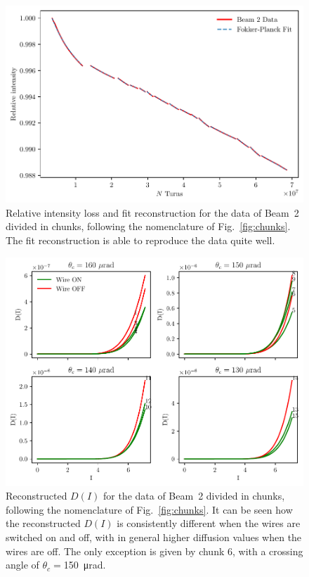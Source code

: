 \begin{figure}[hpt]
    \centering
    \includegraphics[width=1.0\textwidth]{5_wire_compensators_LHC/figs/losses_b2.pdf}
    \caption{Relative intensity loss and fit reconstruction for the data of Beam~2 divided in chunks, following the nomenclature of Fig.~\ref{fig:chunks}. 
    The fit reconstruction is able to reproduce the data quite well.}
    \label{fig:reconstruction_4}
\end{figure}

\begin{figure}[hpt]
    \centering
    \includegraphics[width=1.0\textwidth]{5_wire_compensators_LHC/figs/fokker_planck_b2_2.pdf}
    \caption{Reconstructed $D(I)$ for the data of Beam~2 divided in chunks, following the nomenclature of Fig.~\ref{fig:chunks}. It can be seen how the reconstructed $D(I)$ is consistently different when the wires are switched on and off, with in general higher diffusion values when the wires are off. The only exception is given by chunk 6, with a crossing angle of $\theta_c=$\SI{150}{\micro\radian}.}
    \label{fig:reconstruction_5}
\end{figure}


